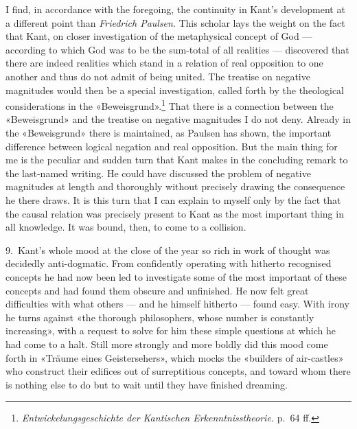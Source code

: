 \documentclass[12pt,a4paper]{article}
\begin{document}
I find, in accordance with the foregoing, the continuity in Kant's
development at a different point than \emph{Friedrich Paulsen}. This scholar lays
the weight on the fact that Kant, on closer investigation of the
metaphysical concept of God --- according to which God was to be the
sum-total of all realities --- discovered that there are indeed realities
which stand in a relation of real opposition to one another and thus do
not admit of being united. The treatise on negative magnitudes would then
be a special investigation, called forth by the theological considerations
in the «Beweisgrund».\footnote{\textit{Entwickelungsgeschichte der
Kantischen Erkenntnisstheorie.} p.\ 64 ff.} That there is a connection
between the «Beweisgrund» and the treatise on negative magnitudes I do not
deny. Already in the «Beweisgrund» there is maintained, as Paulsen has
shown, the important difference between logical negation and real
opposition. But the main thing for me is the peculiar and sudden turn that
Kant makes in the concluding remark to the last-named writing. He could
have discussed the problem of negative magnitudes at length and thoroughly
without precisely drawing the consequence he there draws. It is this turn
that I can explain to myself only by the fact that the causal relation was
precisely present to Kant as the most important thing in all knowledge. It
was bound, then, to come to a collision.

9.\ Kant's whole mood at the close of the year so rich in work of thought
was decidedly anti-dogmatic. From confidently operating with hitherto
recognised concepts he had now been led to investigate some of the most
important of these concepts and had found them obscure and unfinished. He
now felt great difficulties with what others --- and he himself hitherto
--- found easy. With irony he turns against «the thorough philosophers,
whose number is constantly increasing», with a request to solve for him
these simple questions at which he had come to a halt. Still more strongly
and more boldly did this mood come forth in «Träume eines Geistersehers»,
which mocks the «builders of air-castles» who construct their edifices out
of surreptitious concepts, and toward whom there is nothing else to do but
to wait until they have finished dreaming.
\end{document}
